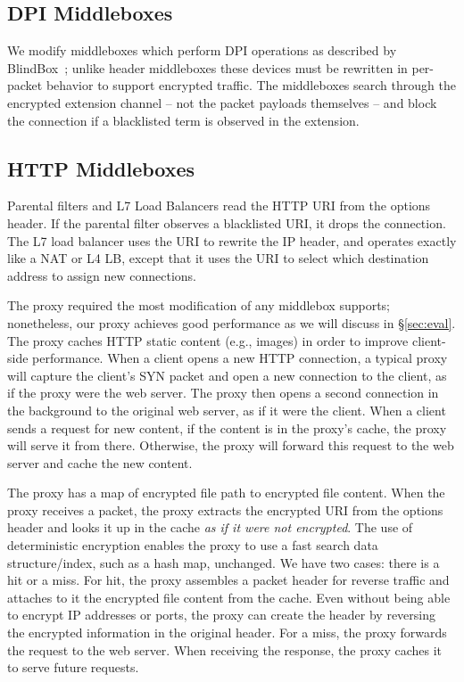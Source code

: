\subsection{DPI Middleboxes}
We modify middleboxes which perform DPI operations as described by BlindBox~\cite{blindbox}; unlike header middleboxes these devices must be rewritten in per-packet behavior to support encrypted traffic.
The middleboxes search through the encrypted extension channel -- not the packet payloads themselves -- and block the connection if a blacklisted term is observed in the extension.

\subsection{HTTP Middleboxes}
Parental filters and L7 Load Balancers read the HTTP URI from the options header. 
If the parental filter observes a blacklisted URI, it drops the connection.
The L7 load balancer uses the URI to rewrite the IP header, and operates exactly like a NAT or L4 LB, except that it uses the URI to select which destination address to assign new connections.

The proxy required the most modification of any middlebox \sys supports; nonetheless, our proxy achieves good performance as we will discuss in \S\ref{sec:eval}.
The proxy  caches HTTP static content (e.g., images) in order to improve client-side performance. 
When a client opens a new HTTP connection, a typical proxy will capture the client's SYN packet and open a new connection to the client, as if the proxy were the web server. The proxy then opens a second connection in the background to the original web server, as if it were the client. 
When a client sends a request for new content, if the content is in the proxy's cache, the proxy will serve it from there. Otherwise, the proxy will forward this request to the web server and cache the new content. 

The proxy has a map of encrypted file path to encrypted file content. When the proxy receives a packet, the proxy extracts the encrypted URI from the options header and looks it up in the cache {\em as if it were not encrypted}. The use of deterministic encryption enables the proxy to use a fast search data structure/index, such as a hash map, unchanged. We have two cases: there is a hit or a miss. For hit, the proxy assembles a packet header for reverse traffic and attaches to it the encrypted file content from the cache. Even without being able to encrypt IP addresses or ports, the proxy can create the header by reversing the encrypted information in the original header.
For a miss, the proxy forwards the request to the web server. When receiving the response, the proxy caches it to serve future requests.



